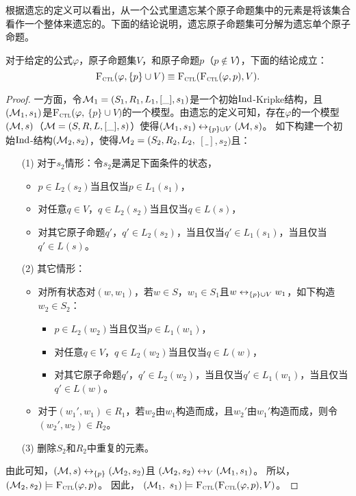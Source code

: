 根据遗忘的定义可以看出，从一个公式里遗忘某个原子命题集中的元素是将该集合看作一个整体来遗忘的。下面的结论说明，遗忘原子命题集可分解为遗忘单个原子命题。
\begin{proposition}\label{disTF}
	对于给定的公式$\varphi$，原子命题集$V$，和原子命题$p$（$p\not \in V$），下面的结论成立：
	\[
	{\textsc{F}_{\textsc{ctl}}}(\varphi,\{p\}\cup V) \equiv {\textsc{F}_{\textsc{ctl}}}({\textsc{F}_{\textsc{ctl}}}(\varphi,p),V).
	\]
\end{proposition}
\begin{proof}
	一方面，令${\cal M}_1=(S_1,R_1,L_1,[\_],s_1)$是一个初始$\textrm{Ind}$-Kripke结构，且$({\cal M}_1,s_1)$是${\textsc{F}_{\textsc{ctl}}}(\varphi,$ $\{p\}\cup V)$的一个模型。由遗忘的定义可知，存在$\varphi$的一个模型$(
	{\cal M},s)$（${\cal M}=(S,R,L,[\_],s)$）使得$({\cal M}_1,s_1)\leftrightarrow_{\{p\}\cup V} ({\cal M},s)$。
	如下构建一个初始$\textrm{Ind}$-结构$({\cal M}_2,s_2)$，使得${\cal M}_2=(S_2,R_2,L_2,$ $[\_],s_2)$且：
	\begin{itemize}
		\item[(1)] 对于$s_2$情形：令$s_2$是满足下面条件的状态，
		\begin{itemize}
			\item $p \in L_2(s_2)$当且仅当$p\in L_1(s_1)$，
			\item 对任意$q \in V$，$q \in L_2(s_2)$当且仅当$q\in L(s)$，
			\item 对其它原子命题$q'$，$q' \in L_2(s_2)$，当且仅当$q'\in L_1(s_1)$，当且仅当$q'\in L(s)$。
		\end{itemize}
		
		\item[(2)] 其它情形：
		\begin{itemize}
			\item 对所有状态对$(w,w_1)$，若$w\in S$，$w_1\in S_1$且$w\leftrightarrow_{\{p\}\cup V} w_1$，如下构造$w_2\in S_2$：%
			\begin{itemize}
				\item $p \in L_2(w_2)$当且仅当$p\in L_1(w_1)$，
				\item 对任意$q \in V$，$q \in L_2(w_2)$当且仅当$q\in L(w)$，
				\item 对其它原子命题$q'$，$q' \in L_2(w_2)$，当且仅当$q'\in L_1(w_1)$，当且仅当$q'\in L(w)$。
			\end{itemize}
			\item 对于$(w_1',w_1)\in R_1$，若$w_2$由$w_1$构造而成，且$w_2'$由$w_1'$构造而成，则令$(w_2',w_2)\in R_2$。
		\end{itemize}
		\item[(3)] 删除$S_2$和$R_2$中重复的元素。
	\end{itemize}
	由此可知，$({\cal M}, s) \leftrightarrow_{\{p\}} ({\cal M}_2, s_2)$且 $({\cal M}_2, s_2) \leftrightarrow_V ({\cal M}_1, s_1)$。 所以，$({\cal M}_2, s_2) \models {\textsc{F}_{\textsc{ctl}}}(\varphi, p)$。 因此， $({\cal M}_1,$ $s_1) \models {\textsc{F}_{\textsc{ctl}}}({\textsc{F}_{\textsc{ctl}}}(\varphi, p), V)$。
	

\end{proof}
